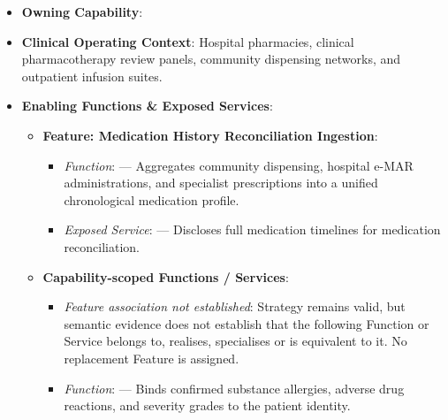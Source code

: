 \begin{itemize}

\item 
\textbf{Owning Capability}: \texttt{}



\item 
\textbf{Clinical Operating Context}: Hospital pharmacies, clinical pharmacotherapy review panels, community dispensing networks, and outpatient infusion suites.



\item 
\textbf{Enabling Functions \& Exposed Services}:


\begin{itemize}

\item 
\textbf{Feature: Medication History Reconciliation Ingestion}:


\begin{itemize}

\item 
\emph{Function}: \texttt{} — Aggregates community dispensing, hospital e-MAR administrations, and specialist prescriptions into a unified chronological medication profile.



\item 
\emph{Exposed Service}: \texttt{} — Discloses full medication timelines for medication reconciliation.



\end{itemize}


\item 
\textbf{Capability-scoped Functions /\allowbreak{} Services}:


\begin{itemize}

\item 
\emph{Feature association not established}: Strategy \texttt{} remains valid, but semantic evidence does not establish that the following Function or Service belongs to, realises, specialises or is equivalent to it. No replacement Feature is assigned.



\item 
\emph{Function}: \texttt{} — Binds confirmed substance allergies, adverse drug reactions, and severity grades to the patient identity.




\end{itemize}
\end{itemize}
\end{itemize}
